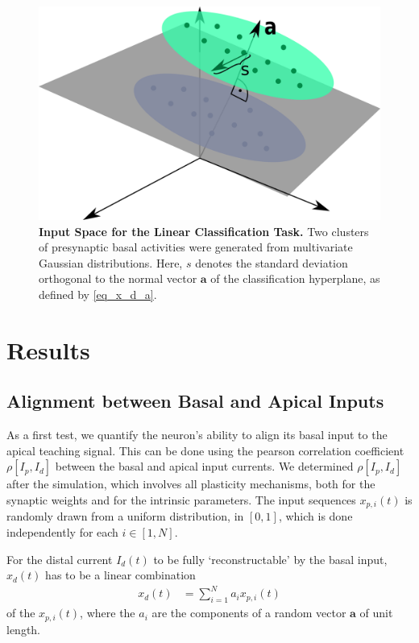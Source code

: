 \documentclass[utf8]{frontiersSCNS} %
\begin{document}
\begin{figure}[t]
\centering
\includegraphics[width=0.55\columnwidth]{illustration_classification}
\caption{{\bf Input Space for the Linear Classification Task.}
Two clusters of presynaptic basal activities were generated from 
multivariate Gaussian distributions. Here, $s$ denotes the standard
deviation orthogonal to the normal vector $\mathbf{a}$ of the 
classification hyperplane, as defined by \eqref{eq_x_d_a}.}
\label{fig_illustration_classification}
\end{figure}

\section{Results}
\label{sect:results}

\subsection{Alignment between Basal and Apical Inputs}
\label{sect:alignment}

As a first test, we quantify the neuron's ability to 
align its basal input to the apical teaching signal.
This can be done using the pearson correlation coefficient
$\rho[I_p,I_d]$ between the basal and 
apical input currents. We determined 
$\rho[I_p,I_d]$ after the simulation,
which involves all plasticity mechanisms, both
for the synaptic weights and for the intrinsic 
parameters. The input sequences $x_{p,i}(t)$ 
is randomly drawn from a uniform distribution,
in $[0,1]$, which is done independently for 
each $i\in[1,N]$.

For the distal current $I_d(t)$ to be fully 
`reconstructable' by the basal input, $x_d(t)$ has 
to be a linear combination 
\begin{align}
x_d(t) &= \sum_{i=1}^N a_i x_{p,i}(t)
\label{eq_x_d_a}
\end{align}
of the $x_{p,i}(t)$, where the $a_i$ are the
components of a random vector $\mathbf{a}$ 
of unit length. 
\end{document}
